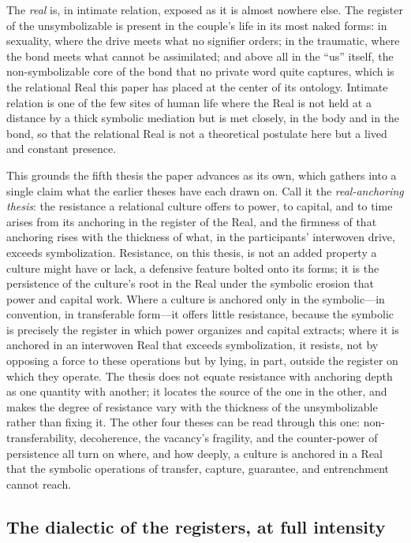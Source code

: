 The \emph{real} is, in intimate relation, exposed as it is almost nowhere else. The register of the unsymbolizable is present in the couple's life in its most naked forms: in sexuality, where the drive meets what no signifier orders; in the traumatic, where the bond meets what cannot be assimilated; and above all in the ``us'' itself, the non-symbolizable core of the bond that no private word quite captures, which is the relational Real this paper has placed at the center of its ontology. Intimate relation is one of the few sites of human life where the Real is not held at a distance by a thick symbolic mediation but is met closely, in the body and in the bond, so that the relational Real is not a theoretical postulate here but a lived and constant presence.

This grounds the fifth thesis the paper advances as its own, which gathers into a single claim what the earlier theses have each drawn on. Call it the \emph{real-anchoring thesis}: the resistance a relational culture offers to power, to capital, and to time arises from its anchoring in the register of the Real, and the firmness of that anchoring rises with the thickness of what, in the participants' interwoven drive, exceeds symbolization. Resistance, on this thesis, is not an added property a culture might have or lack, a defensive feature bolted onto its forms; it is the persistence of the culture's root in the Real under the symbolic erosion that power and capital work. Where a culture is anchored only in the symbolic---in convention, in transferable form---it offers little resistance, because the symbolic is precisely the register in which power organizes and capital extracts; where it is anchored in an interwoven Real that exceeds symbolization, it resists, not by opposing a force to these operations but by lying, in part, outside the register on which they operate. The thesis does not equate resistance with anchoring depth as one quantity with another; it locates the source of the one in the other, and makes the degree of resistance vary with the thickness of the unsymbolizable rather than fixing it. The other four theses can be read through this one: non-transferability, decoherence, the vacancy's fragility, and the counter-power of persistence all turn on where, and how deeply, a culture is anchored in a Real that the symbolic operations of transfer, capture, guarantee, and entrenchment cannot reach.

\subsection*{The dialectic of the registers, at full intensity}

